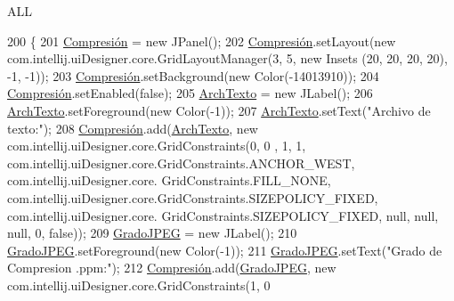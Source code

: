A\+LL 
\begin{DoxyCode}
200                                  \{
201         \hyperlink{classpresentacion_1_1form_1_1PopUp__Comp_a5769b499f21466bae765c41428512966}{Compresión} = \textcolor{keyword}{new} JPanel();
202         \hyperlink{classpresentacion_1_1form_1_1PopUp__Comp_a5769b499f21466bae765c41428512966}{Compresión}.setLayout(\textcolor{keyword}{new} com.intellij.uiDesigner.core.GridLayoutManager(3, 5, \textcolor{keyword}{new} Insets
      (20, 20, 20, 20), -1, -1));
203         \hyperlink{classpresentacion_1_1form_1_1PopUp__Comp_a5769b499f21466bae765c41428512966}{Compresión}.setBackground(\textcolor{keyword}{new} Color(-14013910));
204         \hyperlink{classpresentacion_1_1form_1_1PopUp__Comp_a5769b499f21466bae765c41428512966}{Compresión}.setEnabled(\textcolor{keyword}{false});
205         \hyperlink{classpresentacion_1_1form_1_1PopUp__Comp_a1b40d49127cf9752ea464d6660f04673}{ArchTexto} = \textcolor{keyword}{new} JLabel();
206         \hyperlink{classpresentacion_1_1form_1_1PopUp__Comp_a1b40d49127cf9752ea464d6660f04673}{ArchTexto}.setForeground(\textcolor{keyword}{new} Color(-1));
207         \hyperlink{classpresentacion_1_1form_1_1PopUp__Comp_a1b40d49127cf9752ea464d6660f04673}{ArchTexto}.setText(\textcolor{stringliteral}{"Archivo de texto:"});
208         \hyperlink{classpresentacion_1_1form_1_1PopUp__Comp_a5769b499f21466bae765c41428512966}{Compresión}.add(\hyperlink{classpresentacion_1_1form_1_1PopUp__Comp_a1b40d49127cf9752ea464d6660f04673}{ArchTexto}, \textcolor{keyword}{new} com.intellij.uiDesigner.core.GridConstraints(0, 0
      , 1, 1, com.intellij.uiDesigner.core.GridConstraints.ANCHOR\_WEST, com.intellij.uiDesigner.core.
      GridConstraints.FILL\_NONE, com.intellij.uiDesigner.core.GridConstraints.SIZEPOLICY\_FIXED, com.intellij.uiDesigner.core.
      GridConstraints.SIZEPOLICY\_FIXED, null, null, null, 0, \textcolor{keyword}{false}));
209         \hyperlink{classpresentacion_1_1form_1_1PopUp__Comp_acf726751a39641f547274bfe8176fedd}{GradoJPEG} = \textcolor{keyword}{new} JLabel();
210         \hyperlink{classpresentacion_1_1form_1_1PopUp__Comp_acf726751a39641f547274bfe8176fedd}{GradoJPEG}.setForeground(\textcolor{keyword}{new} Color(-1));
211         \hyperlink{classpresentacion_1_1form_1_1PopUp__Comp_acf726751a39641f547274bfe8176fedd}{GradoJPEG}.setText(\textcolor{stringliteral}{"Grado de Compresion .ppm:"});
212         \hyperlink{classpresentacion_1_1form_1_1PopUp__Comp_a5769b499f21466bae765c41428512966}{Compresión}.add(\hyperlink{classpresentacion_1_1form_1_1PopUp__Comp_acf726751a39641f547274bfe8176fedd}{GradoJPEG}, \textcolor{keyword}{new} com.intellij.uiDesigner.core.GridConstraints(1, 0

\end{DoxyCode}

